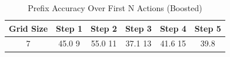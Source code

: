 \begin{table}[h]
\centering
\caption{Prefix Accuracy Over First N Actions (Boosted)}
\label{tab:prefix_accuracy_boosted}
\begin{tabular}{c|ccccc}
\hline
\textbf{Grid Size} & \textbf{Step 1} & \textbf{Step 2} & \textbf{Step 3} & \textbf{Step 4} & \textbf{Step 5} \\
\hline
7 & 45.0%
9 & 55.0%
11 & 37.1%
13 & 41.6%
15 & 39.8%
\hline
\end{tabular}
\end{table}